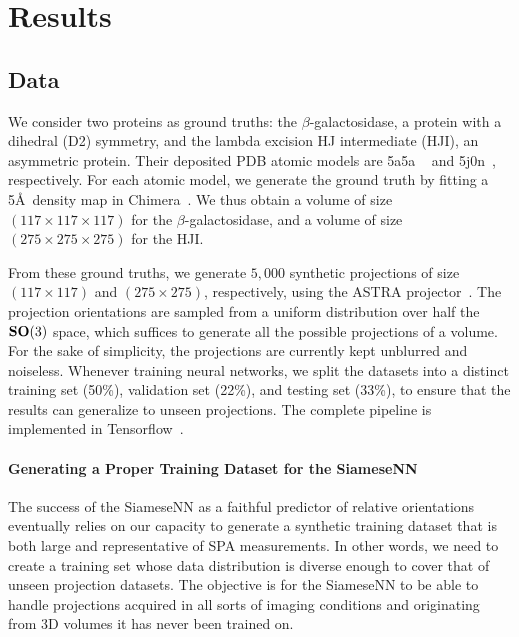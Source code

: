 \section{Results}

\subsection{Data}\label{sec:results:data}


We consider two proteins as ground truths: the $\beta$-galactosidase, a protein with a dihedral (D2) symmetry, and the lambda excision HJ intermediate (HJI), an asymmetric protein.
Their deposited PDB atomic models are 5a5a ~\cite{bartesaghi2015betagal} and 5j0n~\cite{laxmikanthan2016structure}, respectively.
For each atomic model, we generate the ground truth by fitting a 5\AA\ density map in Chimera~\cite{pettersen2004ucsf}.
We thus obtain a volume of size $(117\times 117\times 117)$ for the $\beta$-galactosidase, and a volume of size $(275\times 275\times 275)$ for the HJI.

From these ground truths, we generate $5,000$ synthetic projections of size $(117\times 117)$ and $(275\times 275)$, respectively, using the ASTRA projector~\cite{van2015astra}.
The projection orientations are sampled from a uniform distribution over half the $\mathrm{\mathbf{SO}}(3)$ space, which suffices to generate all the possible projections of a volume.
For the sake of simplicity, the projections are currently kept unblurred and noiseless.
Whenever training neural networks, we split the datasets into a distinct training set (50\%), validation set (22\%), and testing set (33\%), to ensure that the results can generalize to unseen projections.
The complete pipeline is implemented in Tensorflow~\cite{abadi2016tensorflow}.

\paragraph{Generating a Proper Training Dataset for the SiameseNN}

The success of the SiameseNN as a faithful predictor of relative orientations eventually relies on our capacity to generate a synthetic training dataset that is both large and representative of SPA measurements.
In other words, we need to create a training set whose data distribution is diverse enough to cover that of unseen projection datasets.
The objective is for the SiameseNN to be able to handle projections acquired in all sorts of imaging conditions and originating from 3D volumes it has never been trained on.

